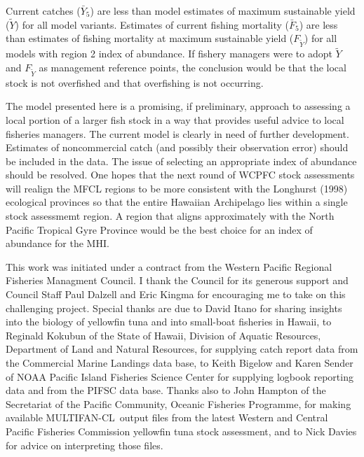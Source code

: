 \documentclass[12pt,letterpaper]{article}
\newcommand\singlespacing{\baselineskip=1.0\normalbaselineskip}
\newcommand\MFCL{MULTIFAN-CL}
\newcommand\MSY{\widetilde{Y}}
\newcommand\Fmsy{F_{\MSY}}
\begin{document}
Current catches ($\bar{Y}_5$) are less than model estimates of maximum
sustainable yield ($\MSY$) for all model variants. 
Estimates of current fishing mortality ($\bar{F}_5$) are less than
estimates of fishing mortality at maximum sustainable yield ($\Fmsy$)
for all models with region 2 index of abundance.
If fishery managers were to adopt $\MSY$ and $\Fmsy$ as management
reference points, the conclusion would be that the local stock is not
overfished and that overfishing is not occurring.

The model presented here is a promising, if preliminary,
approach to assessing a local
portion of a larger fish stock in a way that provides useful advice to
local fisheries managers. The current model is clearly in need of
further development. Estimates of noncommercial catch (and possibly
their observation error) should be included in the data. 
The issue of selecting an appropriate index of abundance should be
resolved. One hopes that the
next round of  WCPFC stock assessments will realign
the MFCL regions to be more consistent
with the Longhurst (1998) ecological provinces so that the entire
Hawaiian Archipelago lies within a single stock assessmemt region. 
A region that aligns approximately with  the North Pacific Tropical
Gyre Province would be the best choice for an index of abundance for
the MHI.



\clearpage
\singlespacing
{}
This work was initiated under a contract from the Western Pacific
Regional Fisheries Managment Council. 
I thank the Council for its generous support and
Council Staff Paul Dalzell and Eric Kingma for encouraging me to
take on this challenging project.
Special thanks are due 
to David Itano for sharing insights into the biology of yellowfin tuna
and into small-boat fisheries in Hawaii,
to Reginald Kokubun of the State of Hawaii, Division of Aquatic Resources,
Department of Land and Natural Resources, for supplying catch report
data from the Commercial Marine Landings data base,
to Keith Bigelow and Karen Sender of NOAA Pacific
Island Fisheries Science Center for supplying logbook reporting data and
from the PIFSC data base.
Thanks also to John Hampton of the Secretariat of the Pacific
Community, Oceanic Fisheries Programme, for making available \MFCL\
output files from the latest Western and Central Pacific
Fisheries Commission yellowfin tuna stock assessment, and to Nick
Davies for advice on interpreting those files.
\end{document}

